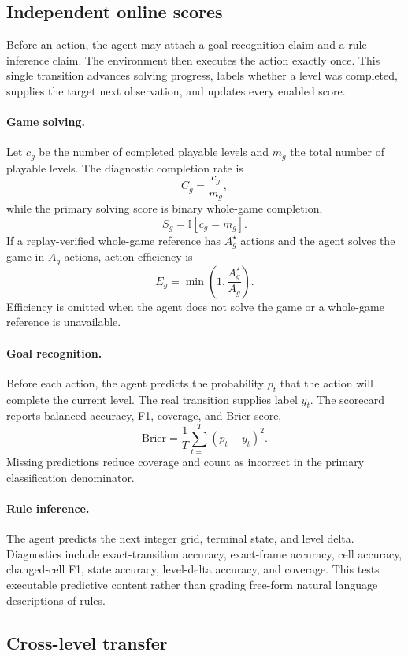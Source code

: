 \documentclass[a4paper,11pt]{article}
\begin{document}
\subsection{Independent online scores}

Before an action, the agent may attach a goal-recognition claim and a
rule-inference claim. The environment then executes the action exactly once.
This single transition advances solving progress, labels whether a level was
completed, supplies the target next observation, and updates every enabled
score.

\paragraph{Game solving.}
Let \(c_g\) be the number of completed playable levels and \(m_g\) the total
number of playable levels. The diagnostic completion rate is
\[
  C_g = \frac{c_g}{m_g},
\]
while the primary solving score is binary whole-game completion,
\[
  S_g = \mathbb{I}[c_g=m_g].
\]
If a replay-verified whole-game reference has \(A_g^\star\) actions and the
agent solves the game in \(A_g\) actions, action efficiency is
\[
  E_g=\min\left(1,\frac{A_g^\star}{A_g}\right).
\]
Efficiency is omitted when the agent does not solve the game or a whole-game
reference is unavailable.

\paragraph{Goal recognition.}
Before each action, the agent predicts the probability \(p_t\) that the action
will complete the current level. The real transition supplies label \(y_t\).
The scorecard reports balanced accuracy, F1, coverage, and Brier score,
\[
  \mathrm{Brier}=\frac{1}{T}\sum_{t=1}^{T}(p_t-y_t)^2.
\]
Missing predictions reduce coverage and count as incorrect in the primary
classification denominator.

\paragraph{Rule inference.}
The agent predicts the next integer grid, terminal state, and level delta.
Diagnostics include exact-transition accuracy, exact-frame accuracy, cell
accuracy, changed-cell F1, state accuracy, level-delta accuracy, and coverage.
This tests executable predictive content rather than grading free-form natural
language descriptions of rules.

\subsection{Cross-level transfer}
\end{document}
